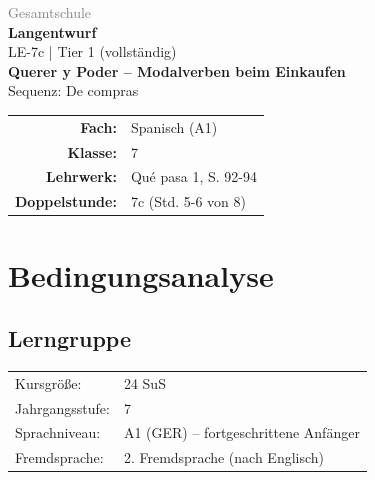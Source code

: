 \documentclass[11pt,a4paper]{article}
\newcommand{\fach}{Spanisch}
\newcommand{\jahrgangsstufe}{7}
\newcommand{\schulart}{Gesamtschule}
\newcommand{\stundenthema}{Querer y Poder -- Modalverben beim Einkaufen}
\newcommand{\reihenthema}{De compras}
\newcommand{\stundennummer}{7c}
\newcommand{\gerniveau}{A1}
\newcommand{\lehrwerk}{Qué pasa 1}
\newcommand{\lehrwerkseite}{S. 92-94}
\newcommand{\lerngruppengroesse}{24}
\begin{document}
\begin{titlepage}
    \centering
    \vspace*{2cm}
    {\large\textcolor{gray}{\schulart}}\\[2cm]
    {\Huge\textcolor{fach}{\textbf{Langentwurf}}}\\[0.5cm]
    {\large LE-\stundennummer{} | Tier 1 (vollständig)}\\[2cm]
    {\LARGE\textbf{\stundenthema}}\\[0.5cm]
    {\large Sequenz: \reihenthema}\\[2cm]
    \begin{tabular}{rl}
        \textbf{Fach:} & \fach{} (\gerniveau) \\[0.3cm]
        \textbf{Klasse:} & \jahrgangsstufe \\[0.3cm]
        \textbf{Lehrwerk:} & \lehrwerk, \lehrwerkseite \\[0.3cm]
        \textbf{Doppelstunde:} & \stundennummer{} (Std. 5-6 von 8) \\[0.3cm]
    \end{tabular}
    \vfill
\end{titlepage}

\tableofcontents
\newpage

\section{Bedingungsanalyse}

\subsection{Lerngruppe}
\begin{tabular}{ll}
    Kursgröße: & \lerngruppengroesse{} SuS \\
    Jahrgangsstufe: & \jahrgangsstufe \\
    Sprachniveau: & \gerniveau{} (GER) -- fortgeschrittene Anfänger \\
    Fremdsprache: & 2. Fremdsprache (nach Englisch) \\
\end{tabular}
\end{document}
